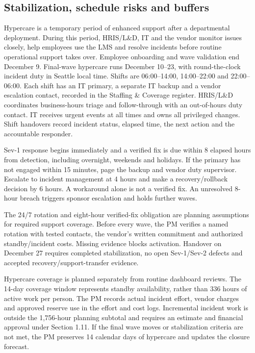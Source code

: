 \subsection{Stabilization, schedule risks and buffers}\label{sec:3.7}
Hypercare is a temporary period of enhanced support after a departmental deployment. During this period, HRIS/\allowbreak{}L\&D, IT and the vendor monitor issues closely, help employees use the LMS and resolve incidents before routine operational support takes over. Employee onboarding and wave validation end December 9. Final-wave hypercare runs December 10--23, with round-the-clock incident duty in Seattle local time. Shifts are 06:00--14:00, 14:00--22:00 and 22:00--06:00. Each shift has an IT primary, a separate IT backup and a vendor escalation contact, recorded in the Staffing \& Coverage register. HRIS/\allowbreak{}L\&D coordinates business-hours triage and follow-through with an out-of-hours duty contact. IT receives urgent events at all times and owns all privileged changes. Shift handovers record incident status, elapsed time, the next action and the accountable responder.


Sev-1 response begins immediately and a verified fix is due within 8 elapsed hours from detection, including overnight, weekends and holidays. If the primary has not engaged within 15 minutes, page the backup and vendor duty supervisor. Escalate to incident management at 4 hours and make a recovery/\allowbreak{}rollback decision by 6 hours. A workaround alone is not a verified fix. An unresolved 8-hour breach triggers sponsor escalation and holds further waves.


The 24/\allowbreak{}7 rotation and eight-hour verified-fix obligation are planning assumptions for required support coverage. Before every wave, the PM verifies a named rotation with tested contacts, the vendor's written commitment and authorized standby/\allowbreak{}incident costs. Missing evidence blocks activation. Handover on December 27 requires completed stabilization, no open Sev-1/\allowbreak{}Sev-2 defects and accepted recovery/\allowbreak{}support-transfer evidence.


Hypercare coverage is planned separately from routine dashboard reviews. The 14-day coverage window represents standby availability, rather than 336 hours of active work per person. The PM records actual incident effort, vendor charges and approved reserve use in the effort and cost logs. Incremental incident work is outside the 1,756-hour planning subtotal and requires an estimate and financial approval under Section 1.11. If the final wave moves or stabilization criteria are not met, the PM preserves 14 calendar days of hypercare and updates the closure forecast.


